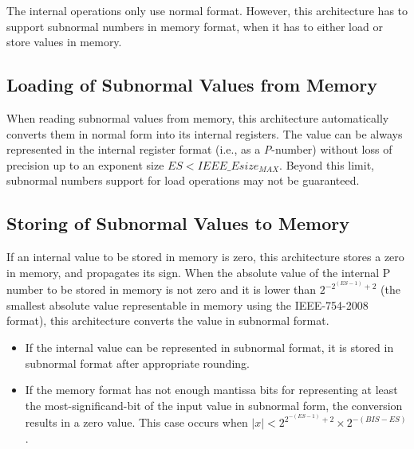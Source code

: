 \label{sec:subnormalFormatSupport}

The internal operations only use normal format.
However, this architecture has to support subnormal numbers in memory format, when it has to either load or store values in memory.

\subsection{Loading of Subnormal Values from Memory}

When reading subnormal values from memory, this architecture automatically converts them in normal form into its internal registers.
The value can be always represented in the internal register format (i.e., as a {\em P}-number) without loss of precision up to an exponent size $ES < IEEE\_Esize_{MAX}$.
Beyond this limit, subnormal numbers support for load operations may not be guaranteed.

\subsection{Storing of Subnormal Values to Memory}

If an internal value to be stored in memory is zero, this architecture stores a zero in memory, and propagates its sign.
When the absolute value of the internal P number to be stored in memory is not zero and it is lower than $2^{-2^{(ES-1)}+2}$ (the smallest absolute value representable in memory using the IEEE-754-2008 format), this architecture converts the value in subnormal format.
\begin{itemize}
    \item If the internal value can be represented in subnormal format, it is stored in subnormal format after appropriate rounding. 
    \item If the memory format has not enough mantissa bits for representing at least the most-significand-bit of the input value in subnormal form, the conversion results in a zero value.
        This case occurs when $ |x| < 2^{2^{-(ES-1)}+2} \times 2^{-(BIS-ES)}$.
\end{itemize}
